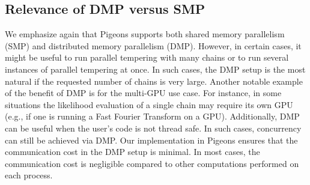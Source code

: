 \subsection{Relevance of DMP versus SMP}

We emphasize again that Pigeons supports both shared memory 
parallelism (SMP) and distributed memory parallelism (DMP). However, in certain cases, it 
might be useful to run parallel tempering with  many chains or 
to run several instances of parallel tempering at once. In such cases, 
the DMP setup is the most natural if the requested number of chains is very large. 
Another notable example of the benefit of DMP is for the multi-GPU use case. 
For instance, in some situations the likelihood evaluation of a single chain may 
require its own GPU (e.g., if one is running a Fast Fourier Transform on a GPU). 
Additionally, DMP can be useful when the user's code is not thread safe. 
In such cases, concurrency can still be achieved via DMP.
Our implementation in Pigeons ensures that the 
communication cost in the DMP setup is minimal. In most cases, the 
communication cost is negligible compared to other computations performed on each process. 

